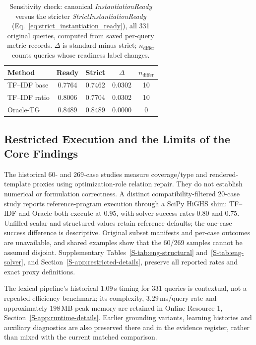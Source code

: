 \documentclass[pdflatex,iicol,sn-basic,Numbered]{sn-jnl}
\begin{document}
\begin{table}[t]
\centering
  \renewcommand{\arraystretch}{1.18}
\caption{Sensitivity check: canonical \textit{InstantiationReady} versus the stricter \textit{StrictInstantiationReady} (Eq.~\eqref{eq:strict_instantiation_ready}), all 331 original queries, computed from saved per-query metric records. $\Delta$ is standard minus strict; $n_{\text{differ}}$ counts queries whose readiness label changes.}
\label{tab:strict-instready}
\small
\setlength{\tabcolsep}{2.4pt}
\begin{tabular}{lcccc}
  \toprule
  Method & Ready & Strict & $\Delta$ & $n_{\text{differ}}$ \\
  \midrule
TF--IDF base & 0.7764 & 0.7462 & 0.0302 & 10 \\
TF--IDF ratio & 0.8006 & 0.7704 & 0.0302 & 10 \\
Oracle-TG & 0.8489 & 0.8489 & 0.0000 & 0 \\
  \bottomrule
\end{tabular}
\end{table}
\subsection{Restricted Execution and the Limits of the Core Findings}
\label{subsec:exp_engineering}
The historical 60- and 269-case studies measure coverage/type and rendered-template proxies using optimization-role relation repair. They do not establish numerical or formulation correctness. A distinct compatibility-filtered 20-case study reports reference-program execution through a SciPy HiGHS shim: TF--IDF and Oracle both execute at $0.95$, with solver-success rates $0.80$ and $0.75$. Unfilled scalar and structured values retain reference defaults; the one-case success difference is descriptive. Original subset manifests and per-case outcomes are unavailable, and shared examples show that the 60/269 samples cannot be assumed disjoint. Supplementary Tables~\ref{S-tab:eng-structural} and~\ref{S-tab:eng-solver}, and Section~\ref{S-app:restricted-details}, preserve all reported rates and exact proxy definitions.

\label{subsec:exp_runtime}
The lexical pipeline's historical $1.09$\,s timing for 331 queries is contextual, not a repeated efficiency benchmark; its complexity, $3.29$\,ms/query rate and approximately $198$\,MB peak memory are retained in Online Resource 1, Section~\ref{S-app:runtime-details}. Earlier grounding variants, learning histories and auxiliary diagnostics are also preserved there and in the evidence register, rather than mixed with the current matched comparison.
\end{document}
